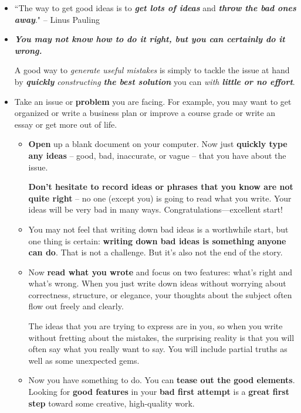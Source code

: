 \documentclass[11pt]{article}
\begin{document}
\begin{itemize}
\item ``The way to get good ideas is to \emph{\textbf{get lots of ideas}} and \emph{\textbf{throw the bad ones away}}." -- Linus Pauling

\item \emph{\textbf{You may not know how to do it right, but you can certainly do it wrong.}} 

A good way to \emph{generate useful mistakes} is simply to tackle the issue at hand by \emph{\textbf{quickly} constructing \textbf{the best solution}} you can \emph{with \textbf{little or no effort}}.

\item \begin{exercise}
Take an issue or \textbf{problem} you are facing. For example, you may want to get organized or write a business plan or improve a course grade or write an essay or get more out of life. 
\begin{itemize}
\item \textbf{Open} up a blank document on your computer. Now just \textbf{quickly type any ideas} -- good, bad, inaccurate, or vague -- that you have about the issue. 

\textbf{Don’t hesitate to record ideas or phrases that you know are not quite right} -- no one (except you) is going to read what you write. Your ideas will be very bad in many ways.  Congratulations—excellent start!

\item You may not feel that writing down bad ideas is a worthwhile start, but one thing is certain: \textbf{writing down bad ideas is something anyone can do}.  That is not a challenge. But it’s also not the end of the story.

\item Now \textbf{read what you wrote} and focus on two features: what’s right and what’s wrong. When you just write down ideas without worrying about correctness, structure, or elegance, your thoughts about the subject often flow out freely and clearly. 

The ideas that you are trying to express are in you, so when you write without fretting about the mistakes, the surprising reality is that you will often say what you really want to say. You will include partial truths as well as some unexpected gems.

\item Now you have something to do. You can \textbf{tease out the good elements}.  Looking for \textbf{good features} in your \textbf{bad first attempt} is a \textbf{great first step} toward some creative, high-quality work.


\end{itemize}
\end{exercise}
\end{itemize}
\end{document}
